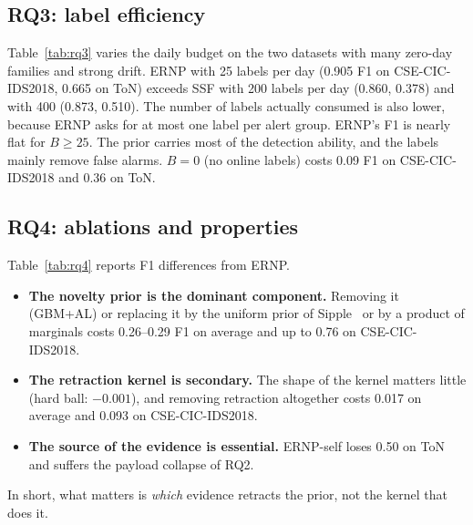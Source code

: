 \documentclass[preprint,12pt]{elsarticle}
\begin{document}
\begin{table}[t]
\centering\small
\caption{RQ2: payload recall / FPR (\%) under slow poisoning on CIDDS-001, five seeds. init/resp: compromised initiator/responder; DoS: known payload; BF: zero-day brute force. $B$: labels per day.}\label{tab:rq2}
\resizebox{\linewidth}{!}{}
\end{table}

\subsection{RQ3: label efficiency}\label{sec:rq3}
Table~\ref{tab:rq3} varies the daily budget on the two datasets with many zero-day families and strong drift. ERNP with 25 labels per day (0.905 F1 on CSE-CIC-IDS2018, 0.665 on ToN) exceeds SSF with 200 labels per day (0.860, 0.378) and with 400 (0.873, 0.510). The number of labels actually consumed is also lower, because ERNP asks for at most one label per alert group. ERNP's F1 is nearly flat for $B\ge25$. The prior carries most of the detection ability, and the labels mainly remove false alarms. $B=0$ (no online labels) costs 0.09 F1 on CSE-CIC-IDS2018 and 0.36 on ToN.

\begin{table}[t]
\centering\small
\caption{RQ3: F1 versus daily label budget $B$ (seeds 0--2). $B=0$: no online labels.}\label{tab:rq3}

\end{table}

\subsection{RQ4: ablations and properties}\label{sec:rq4}
Table~\ref{tab:rq4} reports F1 differences from ERNP.
\begin{itemize}
\item \textbf{The novelty prior is the dominant component.} Removing it (GBM+AL) or replacing it by the uniform prior of Sipple~\cite{sipple2020negative} or by a product of marginals costs 0.26--0.29 F1 on average and up to 0.76 on CSE-CIC-IDS2018.
\item \textbf{The retraction kernel is secondary.} The shape of the kernel matters little (hard ball: $-0.001$), and removing retraction altogether costs 0.017 on average and 0.093 on CSE-CIC-IDS2018.
\item \textbf{The source of the evidence is essential.} ERNP-self loses 0.50 on ToN and suffers the payload collapse of RQ2.
\end{itemize}
In short, what matters is \emph{which} evidence retracts the prior, not the kernel that does it.
\end{document}
